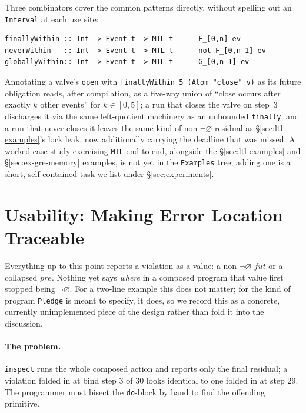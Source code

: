 \documentclass[acmsmall,screen]{acmart}
\newcommand{\pre}{\mathit{pre}}
\newcommand{\fut}{\mathit{fut}}
\newcommand{\univ}{\neg\varnothing}
\begin{document}
Three combinators cover the common patterns directly, without spelling out
an \lstinline{Interval} at each use site:
\begin{lstlisting}
finallyWithin :: Int -> Event t -> MTL t   -- F_[0,n] ev
neverWithin   :: Int -> Event t -> MTL t   -- not F_[0,n-1] ev
globallyWithin:: Int -> Event t -> MTL t   -- G_[0,n-1] ev
\end{lstlisting}
Annotating a valve's \lstinline{open} with
\lstinline{finallyWithin 5 (Atom "close" v)} as its future obligation reads,
after compilation, as a five-way union of ``close occurs after exactly $k$
other events'' for $k \in [0,5]$; a run that closes the valve on step~$3$
discharges it via the same left-quotient machinery as an unbounded
\lstinline{finally}, and a run that never closes it leaves the same kind of
non-$\univ$ residual as \S\ref{sec:ltl-examples}'s lock leak, now additionally
carrying the deadline that was missed.
A worked case study exercising \lstinline{MTL} end to end, alongside the
\S\ref{sec:ltl-examples} and \S\ref{sec:ex-gre-memory} examples, is not yet
in the \texttt{Examples} tree; adding one is a short, self-contained task
we list under \S\ref{sec:experiments}.

\section{Usability: Making Error Location Traceable}
\label{sec:usability}

Everything up to this point reports a violation as a value: a non-$\univ$
$\fut$ or a collapsed $\pre$.
Nothing yet says \emph{where} in a composed program that value first
stopped being $\univ$.
For a two-line example this does not matter; for the kind of program
\lstinline{Pledge} is meant to specify, it does, so we record this as a
concrete, currently unimplemented piece of the design rather than fold it
into the discussion.

\paragraph{The problem.}
\lstinline{inspect} runs the whole composed action and reports only the
final residual; a violation folded in at bind step 3 of 30 looks identical
to one folded in at step 29.
The programmer must bisect the \lstinline{do}-block by hand to find the
offending primitive.
\end{document}
